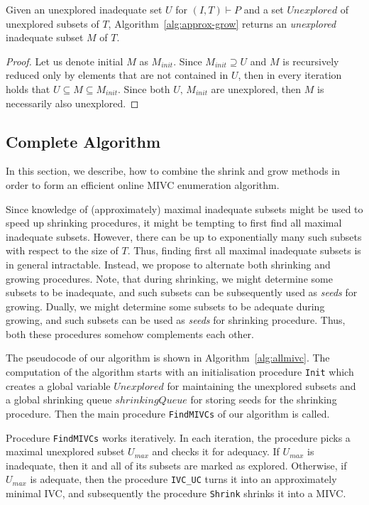 \begin{proposition}
Given an unexplored inadequate set $U$ for $(I,T) \vdash P$ and a set $\mathit{Unexplored}$ of unexplored subsets of $T$, Algorithm~\ref{alg:approx-grow} returns an \emph{unexplored} inadequate subset $M$ of $T$.
\end{proposition}

\begin{proof}
Let us denote initial $M$ as $M_{init}$. Since $M_{init} \supseteq U$ and $M$ is recursively reduced only by elements that are not contained in $U$, then in every iteration holds that $U \subseteq M \subseteq M_{init}$. Since both $U, \, M_{init}$ are unexplored, then $M$ is necessarily also unexplored.
\end{proof}



\subsection{Complete Algorithm}
In this section, we describe, how to combine the shrink and grow methods in order to form an efficient online MIVC enumeration algorithm.

Since knowledge of (approximately) maximal inadequate subsets might be used to speed up shrinking procedures, it might be tempting to first find all maximal inadequate subsets. However, there can be up to exponentially many such subsets with respect to the size of $T$. Thus, finding first all maximal inadequate subsets is in general intractable. Instead, we propose to alternate both shrinking and growing procedures. Note, that during shrinking, we might determine some subsets to be inadequate, and such subsets can be subsequently used as \emph{seeds} for growing. Dually, we might determine some subsets to be adequate during growing, and such subsets can be used as \emph{seeds} for shrinking procedure. Thus, both these procedures somehow complements each other.

The pseudocode of our algorithm is shown in Algorithm~\ref{alg:allmivc}. The computation of the algorithm starts with an initialisation procedure \texttt{Init} which creates a global variable $\mathit{Unexplored}$ for maintaining the unexplored subsets and a global shrinking queue $\mathit{shrinkingQueue}$ for storing seeds for the shrinking procedure. Then the main procedure \texttt{FindMIVCs} of our algorithm is called. 

Procedure \texttt{FindMIVCs} works iteratively. In each iteration, the procedure picks a maximal unexplored subset $U_{max}$ and checks it for adequacy. If $U_{max}$ is inadequate, then it and all of its subsets are marked as explored. Otherwise, if $U_{max}$ is adequate, then the procedure \texttt{IVC\_UC} turns it into an approximately minimal IVC, and subsequently the procedure \texttt{Shrink} shrinks it into a MIVC.


